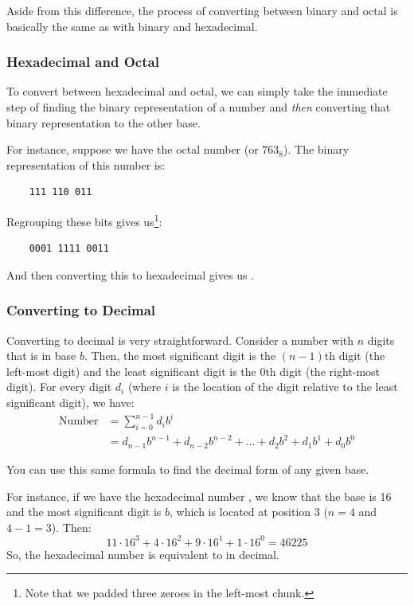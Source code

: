 \documentclass[letterpaper]{article}
\begin{document}
Aside from this difference, the process of converting between binary and octal is basically the same as with binary and hexadecimal.  


\subsubsection{Hexadecimal and Octal}
To convert between hexadecimal and octal, we can simply take the immediate step of finding the binary representation of a number and \emph{then} converting that binary representation to the other base.

\bigskip 

For instance, suppose we have the octal number  (or $763_8$). The binary representation of this number is:
\begin{verbatim}
    111 110 011
\end{verbatim} 
Regrouping these bits gives us\footnote{Note that we padded three zeroes in the left-most chunk.}:
\begin{verbatim}
    0001 1111 0011
\end{verbatim}
And then converting this to hexadecimal gives us .


\subsubsection{Converting to Decimal}
Converting to decimal is very straightforward. Consider a number with $n$ digits that is in base $b$. Then, the most significant digit is the $(n - 1)$th digit (the left-most digit) and the least significant digit is the 0th digit (the right-most digit). For every digit $d_i$ (where $i$ is the location of the digit relative to the least significant digit), we have:
\begin{equation*}
    \begin{aligned}
        \text{Number} &= \sum_{i = 0}^{n - 1} d_i b^i \\ 
            &= d_{n - 1} b^{n - 1} + d_{n - 2} b^{n - 2} + \dots + d_2 b^2 + d_1 b^1 + d_0 b^0
    \end{aligned}
\end{equation*}

You can use this same formula to find the decimal form of any given base. 

\bigskip 

For instance, if we have the hexadecimal number , we know that the base is 16 and the most significant digit is $b$, which is located at position 3 ($n = 4$ and $4 - 1 = 3$). Then:
\[11 \cdot 16^3 + 4 \cdot 16^2 + 9 \cdot 16^1 + 1 \cdot 16^0 = 46225\]
So, the hexadecimal number  is equivalent to  in decimal. 
\end{document}

